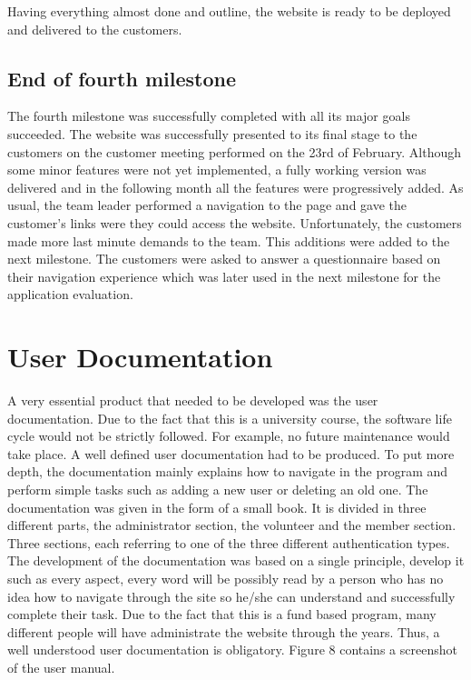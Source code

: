\documentclass{l3proj}
\begin{document}
Having everything almost done and outline, the website is ready to be deployed and delivered to the customers.

\subsection{End of fourth milestone}
\label{sec:milestone4}

The fourth milestone was successfully completed with all its major goals succeeded. The website was successfully presented to its final stage to the customers on the customer meeting performed on the 23rd of February. Although some minor features were not yet implemented, a fully working version was delivered and in the following month all the features were progressively added. As usual, the team leader performed a navigation to the page and gave the customer's links were they could access the website. Unfortunately, the customers made more last minute demands to the team. This additions were added to the next milestone. The customers were asked to answer a questionnaire based on their navigation experience which was later used in the next milestone for the application evaluation.


\section{User Documentation}
\label{sec:user_doc}
 
A very essential product that needed to be developed was the user documentation. Due to the fact that this is a university course, the software life cycle would not be strictly followed. For example, no future maintenance would take place. A well defined user documentation had to be produced. To put more depth, the documentation mainly explains how to navigate in the program and perform simple tasks such as adding a new user or deleting an old one. The documentation was given in the form of a small book. It is divided in three different parts, the administrator section, the volunteer and the member section. Three sections, each referring to one of the three different authentication types. The development of the documentation was based on a single principle, develop it such as every aspect, every word will be possibly read by a person who has no idea how to navigate through the site so he/she can understand and successfully complete their task. Due to the fact that this is a fund based program, many different people will have administrate the website through the years. Thus, a well understood user documentation is obligatory.
Figure 8 contains a screenshot of the user manual.
\end{document}
